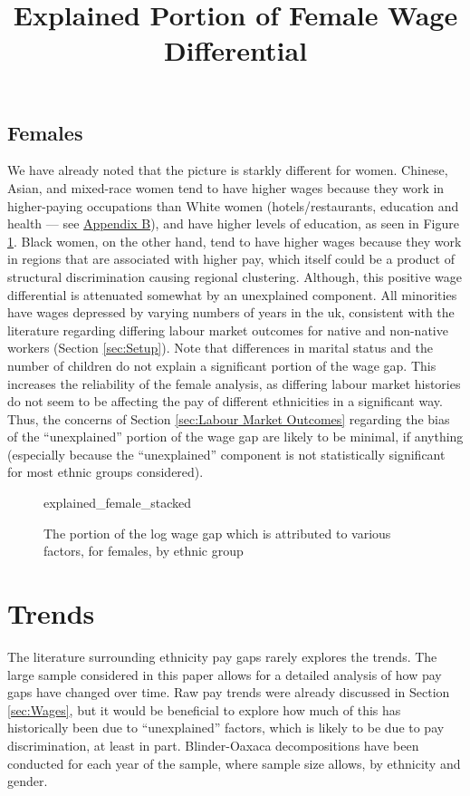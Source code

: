 \documentclass[class=article, crop=false]{standalone}
\begin{document}
\subsection{Females}
\label{sec:females_explained}
We have already noted that the picture is starkly different for women. Chinese, Asian, and mixed-race women tend to have higher wages because they work in higher-paying occupations than White women (hotels/restaurants, education and health --- see \hyperref[sec:appendixB]{Appendix B}), and have higher levels of education, as seen in Figure \ref{fig:explained_female_stacked}. Black women, on the other hand, tend to have higher wages because they work in regions that are associated with higher pay, which itself could be a product of structural discrimination causing regional clustering. Although, this positive wage differential is attenuated somewhat by an unexplained component. All minorities have wages depressed by varying numbers of years in the \acrshort{uk}, consistent with the literature regarding differing labour market outcomes for native and non-native workers (Section \ref{sec:Setup}). Note that differences in marital status and the number of children do not explain a significant portion of the wage gap. This increases the reliability of the female analysis, as differing labour market histories do not seem to be affecting the pay of different ethnicities in a significant way. Thus, the concerns of Section \ref{sec:Labour Market Outcomes} regarding the bias of the \enquote{unexplained} portion of the wage gap are likely to be minimal, if anything (especially because the \enquote{unexplained} component is not statistically significant for most ethnic groups considered).

\begin{figure}[]
\centering
    \title{Explained Portion of Female Wage Differential}
    {explained_female_stacked}
    \caption{The portion of the log wage gap which is attributed to various factors, for females, by ethnic group}
    \label{fig:explained_female_stacked}
\end{figure}

\section{Trends}
\label{sec:time_trends}
The literature surrounding ethnicity pay gaps rarely explores the trends. The large sample considered in this paper allows for a detailed analysis of how pay gaps have changed over time. Raw pay trends were already discussed in Section \ref{sec:Wages}, but it would be beneficial to explore how much of this has historically been due to \enquote{unexplained} factors, which is likely to be due to pay discrimination, at least in part. Blinder-Oaxaca decompositions have been conducted for each year of the sample, where sample size allows, by ethnicity and gender.
\end{document}
